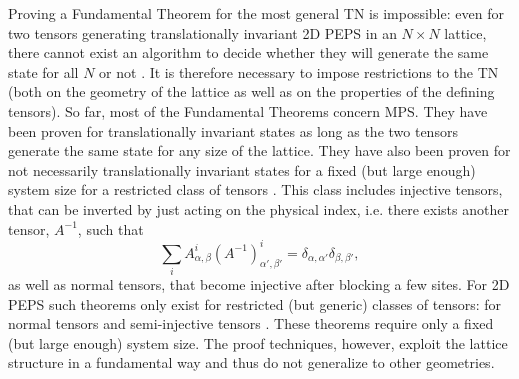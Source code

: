 \documentclass[preprint, superscriptaddress,a4paper,longbibliography]{revtex4-1}
\theoremstyle{definition}
\begin{document}
Proving a Fundamental Theorem for the most general TN is impossible: even for two tensors generating translationally invariant 2D PEPS in an $N\times N$ lattice, there cannot exist an algorithm to decide whether they will generate the same state for all $N$ or not \cite{Scarpa2018}. It is therefore necessary to impose restrictions to the TN (both on the geometry of the lattice as well as on the properties of the defining tensors).
So far, most of the Fundamental Theorems concern MPS. They have been proven for translationally invariant states \cite{Cirac2017,Cuevas2017} as long as the two tensors generate the same state for any size of the lattice. They have also been proven for not necessarily translationally invariant states for a fixed (but large enough) system size for a restricted class of tensors \cite{Perez-Garcia2010}. This class includes injective tensors, that can be inverted by just acting on the physical index, i.e. there exists another tensor, $A^{-1}$, such that
\begin{equation*}
    \sum_i A^i_{\alpha,\beta} (A^{-1})^{i}_{\alpha',\beta'}=
    \delta_{\alpha,\alpha'}\delta_{\beta,\beta'},
\end{equation*}
as well as normal tensors, that become injective after blocking a few sites. For 2D PEPS such theorems only exist for restricted (but generic) classes of tensors: for normal tensors \cite{Perez-Garcia2010} and semi-injective tensors \cite{Molnar2017}. These theorems require only a fixed (but large enough) system size. The proof techniques, however, exploit the lattice structure in a fundamental way and thus do not generalize to other geometries.
\end{document}
